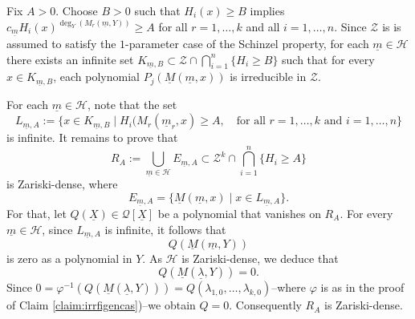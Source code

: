 \documentclass[11pt,a4paper,reqno]{amsart}
\theoremstyle{definition}
\begin{document}
Fix $A>0$. Choose $B>0$ such that $H_i(x) \geq B$ implies $c_{\underline{m}}H_i(x)^{\deg_Y(M_{r}(\underline{m},Y))} \geq A$ for all $r=1,\dots,k$ and all $i=1,\dots,n$. Since $\mathcal{Z}$ is {is assumed to satisfy the $1$-parameter case of the Schinzel property}, for each $\underline{m} \in \mathcal{H}$ there exists an infinite set $K_{\underline m,B} \subset \mathcal{Z} \cap \bigcap_{i=1}^n \{  H_i \geq B \}$ such that for every $x \in K_{\underline m,B}$, each polynomial $P_j(\underline{M}(\underline{m},x))$ is irreducible in $\mathcal Z$. 

 For each $\underline{m} \in \mathcal H$, note that the set
$$
L_{\underline{m},A}:=\{x \in K_{\underline{m},B} \mid H_i(M_r(\underline{m}_r,x) \geq A,\quad\textrm{for all } r=1,\dots,k\,\,\textrm{and }i=1,\dots,n\}
$$ is infinite. It remains to prove that
$$
R_A:=\bigcup_{\underline{m} \in \mathcal{H}} E_{\underline{m},A} \subset \mathcal{Z}^k \cap \bigcap_{i=1}^n \{ H_i \geq A\}
$$ is Zariski-dense, where
$$
E_{\underline{m},A}=\{\underline{M}(\underline{m},x) \mid x \in L_{\underline{m},A}\}.
$$
For that, let $Q(\underline{X}) \in \mathcal{Q}[\underline{X}]$ be a polynomial that vanishes on $R_A$. For every $\underline{m} \in \mathcal H$, since $L_{\underline{m},A}$ is infinite, it follows that
$$
Q(\underline{M}(\underline{m},Y))
$$ 
is zero as a polynomial in $Y$. As $\mathcal H$ is Zariski-dense, we deduce that
$$
Q(\underline{M}(\underline{\lambda},Y))=0.
$$ Since $0=\varphi^{-1}(Q(\underline{M}(\underline{\lambda},Y)))=Q(\lambda_{1,0},\dots,\lambda_{k,0})$--where $\varphi$ is as in the proof of Claim \ref{claim:irrfigencas})--we obtain $Q=0$. Consequently $R_A$ is Zariski-dense.





\end{document}
